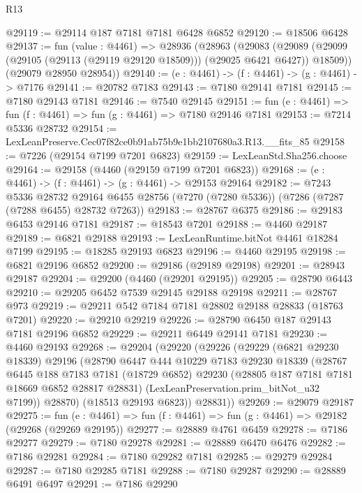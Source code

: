 \begin{lexlean}{R13}
\begin{coremodule}
@29119 := @29114 @187 @7181 @7181 @6428 @6852
@29120 := @18506 @6428
@29137 := fun (value : @4461) =>
  @28936
    (@28963
      (@29083
        (@29089 (@29099 (@29105 (@29113 (@29119 @29120 @18509))) (@29025 @6421 @6427)) @18509))
      (@29079 @28950 @28954))
@29140 := (e : @4461) -> (f : @4461) -> (g : @4461) -> @7176
@29141 := @20782 @7183
@29143 := @7180 @29141 @7181
@29145 := @7180 @29143 @7181
@29146 := @7540 @29145
@29151 := fun (e : @4461) => fun (f : @4461) => fun (g : @4461) => @7180 @29146 @7181
@29153 := @7214 @5336 @28732
@29154 := LexLeanPreserve.Cec07f82ce0b91ab75b9e1bb2107680a3.R13.__fits_85
@29158 := @7226 (@29154 @7199 @7201 @6823)
@29159 := LexLeanStd.Sha256.choose
@29164 := @29158 (@4460 (@29159 @7199 @7201 @6823))
@29168 := (e : @4461) -> (f : @4461) -> (g : @4461) -> @29153 @29164
@29182 := @7243
    @5336
    @28732
    @29164
    @6455
    @28756
    (@7270 (@7280 @5336))
    (@7286 (@7287 (@7288 @6455) @28732 @7263))
@29183 := @28767 @6375
@29186 := @29183 @6453 @29146 @7181
@29187 := @18543 @7201
@29188 := @4460 @29187
@29189 := @6821 @29188
@29193 := LexLeanRuntime.bitNot @4461 @18284 @7199
@29195 := @18285 @29193 @6823
@29196 := @4460 @29195
@29198 := @6821 @29196 @6852
@29200 := @29186 (@29189 @29198)
@29201 := @28943 @29187
@29204 := @29200 (@4460 (@29201 @29195))
@29205 := @28790 @6443
@29210 := @29205 @6452 @7539 @29145 @29188 @29198
@29211 := @28767 @973
@29219 := @29211 @542 @7184 @7181 @28802 @29188 @28833 (@18763 @7201)
@29220 := @29210 @29219
@29226 := @28790 @6450 @187 @29143 @7181 @29196 @6852
@29229 := @29211 @6449 @29141 @7181
@29230 := @4460 @29193
@29268 := @29204
    (@29220
      (@29226
        (@29229
          (@6821 @29230 @18339)
          @29196
          (@28790
            @6447
            @444
            @10229
            @7183
            @29230
            @18339
            (@28767
              @6445
              @188
              @7183
              @7181
              (@18729 @6852)
              @29230
              (@28805 @187 @7181 @7181 @18669 @6852 @28817 @28831)
              (LexLeanPreservation.prim_bitNot_u32 @7199))
            @28870)
          (@18513 @29193 @6823))
        @28831))
@29269 := @29079 @29187
@29275 := fun (e : @4461) => fun (f : @4461) => fun (g : @4461) => @29182 (@29268 (@29269 @29195))
@29277 := @28889 @4761 @6459
@29278 := @7186 @29277
@29279 := @7180 @29278
@29281 := @28889 @6470 @6476
@29282 := @7186 @29281
@29284 := @7180 @29282 @7181
@29285 := @29279 @29284
@29287 := @7180 @29285 @7181
@29288 := @7180 @29287
@29290 := @28889 @6491 @6497
@29291 := @7186 @29290

\end{coremodule}
\end{lexlean}
